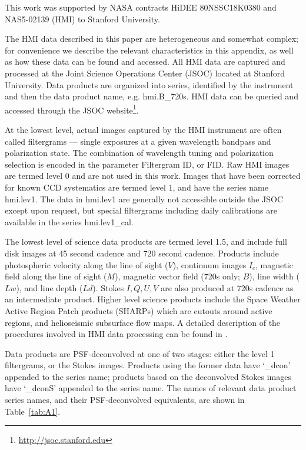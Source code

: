 \documentclass[trackchanges]{aastex62}
\begin{document}
\acknowledgments
This work was supported by NASA contracts HiDEE 80NSSC18K0380 and NAS5-02139 (HMI) to Stanford University. 

\clearpage


\appendix
\setcounter{table}{0}
\renewcommand{\thetable}{A\arabic{table}}
The HMI data described in this paper are heterogeneous and somewhat complex; for convenience we describe the relevant characteristics in this appendix, as well as how these data can be found and accessed. All HMI data are captured and processed at the Joint Science Operations Center (JSOC) located at Stanford University. Data products are organized into series, identified by the instrument and then the data product name, e.g. hmi.B\_720s. HMI data can be queried and accessed through the JSOC website\footnote{\href{http://jsoc.stanford.edu}{http://jsoc.stanford.edu}}. 

At the lowest level, actual images captured by the HMI instrument are often called filtergrams --- single exposures at a given wavelength bandpass and polarization state. The combination of wavelength tuning and polarization selection is encoded in the parameter Filtergram ID, or FID. Raw HMI images are termed level 0 and are not used in this work. Images that have been corrected for known CCD systematics are termed level 1, and have the series name hmi.lev1. The data in hmi.lev1 are generally not accessible outside the JSOC except upon request, but special filtergrams including daily calibrations are available in the series hmi.lev1\_cal.

The lowest level of science data products are termed level 1.5, and include full disk images at 45 second cadence and 720 second cadence. Products include photospheric velocity along the line of sight ($V$), continuum images $I_c$, magnetic field along the line of sight ($M$), magnetic vector field (720s only; $B$), line width ($Lw$), and line depth ($Ld$). Stokes $I, Q, U, V$ are also produced at 720s cadence as an intermediate product. Higher level science products include the Space  Weather Active Region Patch products (SHARPs) which are cutouts around active regions, and helioseismic subsurface flow maps. A detailed description of the procedures involved in HMI data processing can be found in \citet{couvidat:2016}. 

Data products are PSF-deconvolved at one of two stages: either the level 1 filtergrams, or the Stokes images. Products using the former data have `\_dcon' appended to the series name; products based on the deconvolved Stokes images have `\_dconS' appended to the series name. The names of relevant data product series names, and their PSF-deconvolved equivalents, are shown in Table~\ref{tab:A1}.
\end{document}
